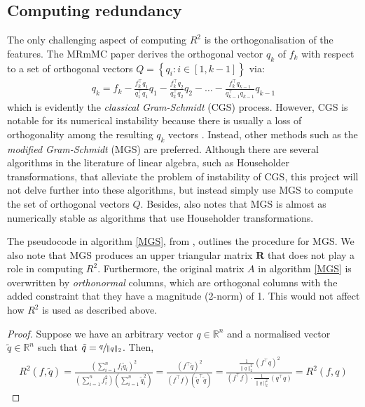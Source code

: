 \documentclass[12pt, twoside, a4paper]{report}
\begin{document}
\subsection{Computing redundancy}

The only challenging aspect of computing $R^2$ is the orthogonalisation of the features. The MRmMC paper \cite{RefWorks:187} derives the orthogonal vector $q_k$ of $f_k$ with respect to a set of orthogonal vectors $Q = \left\lbrace q_i: i \in [1, k-1] \right\rbrace$ via:
\begin{align*}
q_k = f_k  - \frac{f_k^\top q_1}{q_1^\top q_1}q_1  - \frac{f_k^\top q_2}{q_2^\top q_2}q_2 - \dots - \frac{f_k^\top q_{k-1}}{q_{k-1}^\top q_{k-1}}q_{k-1}
\end{align*}
which is evidently the \textit{classical Gram-Schmidt} (CGS) process. However, CGS is notable for its numerical instability because there is usually a loss of orthogonality among the resulting $q_k$ vectors \cite{RefWorks:195}. Instead, other methods such as the \textit{modified Gram-Schmidt} (MGS) are preferred. Although there are several algorithms in the literature of linear algebra, such as Householder transformations, that alleviate the problem of instability of CGS, this project will not delve further into these algorithms, but instead simply use MGS to compute the set of orthogonal vectors $Q$. Besides, \cite{RefWorks:194} also notes that MGS is almost as numerically stable as algorithms that use Householder transformations.

The pseudocode in algorithm \ref{MGS}, from \cite{RefWorks:195}, outlines the procedure for MGS. We also note that MGS produces an upper triangular matrix $\boldsymbol R$ that does not play a role in computing $R^2$. Furthermore, the original matrix $A$ in algorithm \ref{MGS} is overwritten by \textit{orthonormal} columns, which are orthogonal columns with the added constraint that they have a magnitude (2-norm) of 1. This would not affect how $R^2$ is used as described above.

\begin{proof}
Suppose we have an arbitrary vector $q \in \mathbb{R}^n$ and a normalised vector $\tilde{q} \in \mathbb{R}^n$ such that $\tilde{q} = \sfrac{q}{\| q \|_2}$. Then,
\begin{align*}
R^2(f, \tilde{q}) = \frac{\left( \sum_{i=1}^n f_i \tilde{q}_i \right)^2}{\left(\sum_{i=1}^n f_i^2 \right) \left( \sum_{i=1}^n \tilde{q}_i^2 \right)}
= \frac{\left( f^\top \tilde{q} \right)^2}{(f^\top f)(\tilde{q}^\top \tilde{q})}
= \frac{\frac{1}{\| q \|^2_2} \left( f^\top q \right)^2}{(f^\top f) \cdot \frac{1}{\| q \|^2_2} \left( q^\top q \right)} = R^2(f, q)
\end{align*}
\end{proof}
\end{document}

